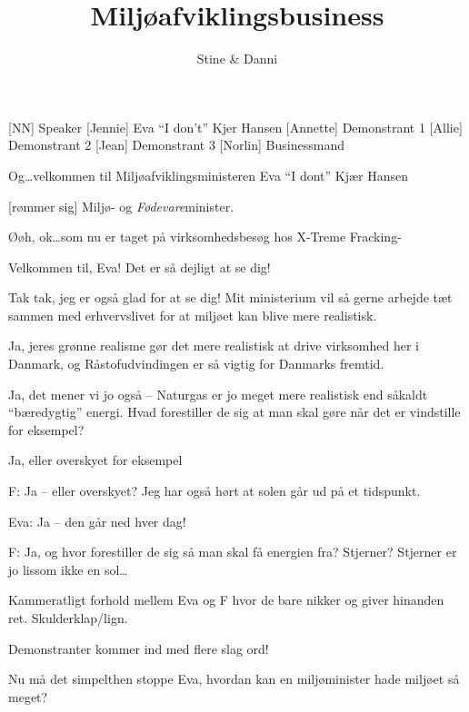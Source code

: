 \documentclass[a4paper,11pt]{article}
\title{Miljøafviklingsbusiness}
\author{Stine \& Danni}
\begin{document}
\maketitle

\begin{roles}
    [NN] Speaker
    [Jennie] Eva ``I don't'' Kjer Hansen
    [Annette] Demonstrant 1
    [Allie] Demonstrant 2
    [Jean] Demonstrant 3
    [Norlin] Businessmand
\end{roles}

\begin{sketch}


 Og\ldots velkommen til Miljøafviklingsministeren Eva ``I dont'' Kjær Hansen
 
[rømmer sig] Miljø- og \emph{Fødevare}minister.
 
 Øøh, ok\ldots som nu er taget på virksomhedsbesøg hos X-Treme Fracking-
 
 Velkommen til, Eva! Det er så dejligt at se dig!
 
 Tak tak, jeg er også glad for at se dig! Mit ministerium vil så gerne arbejde tæt sammen med erhvervslivet for at miljøet kan blive mere realistisk.
 
 Ja, jeres grønne realisme gør det mere realistisk at drive virksomhed her i Danmark, og Råstofudvindingen er så vigtig for Danmarks fremtid. 
 
 Ja, det mener vi jo også -- Naturgas er jo meget mere realistisk end såkaldt “bæredygtig” energi. Hvad forestiller de sig at man skal gøre når det er vindstille for eksempel?

 Ja, eller overskyet for eksempel

F: Ja -- eller overskyet? Jeg har også hørt at solen går ud på et tidspunkt. 

Eva: Ja -- den går ned hver dag!

F: Ja, og hvor forestiller de sig så man skal få energien fra? Stjerner? Stjerner er jo lissom ikke en sol\ldots 

\scene Kammeratligt forhold mellem Eva og F hvor de bare nikker og giver hinanden ret. Skulderklap/lign.

\scene Demonstranter kommer ind med flere slag ord!

 Nu må det simpelthen stoppe Eva, hvordan kan en miljøminister hade miljøet så meget?


\end{sketch}
\end{document}

